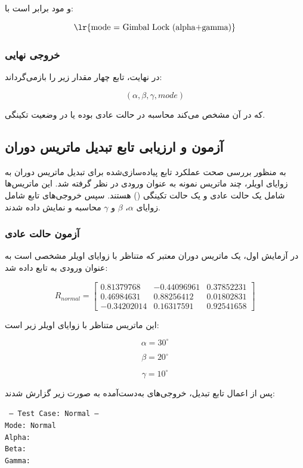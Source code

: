 \documentclass{article}
\begin{document}
و مود برابر است با:

\[
\text{\lr{mode = Gimbal Lock (alpha+gamma)}}
\]

\subsubsection{خروجی نهایی}

در نهایت، تابع چهار مقدار زیر را بازمی‌گرداند:

\[
(\alpha, \beta, \gamma, mode)
\]

که در آن 
مشخص می‌کند محاسبه در حالت عادی بوده یا در وضعیت تکینگی.
\subsection{آزمون و ارزیابی تابع تبدیل ماتریس دوران}

به منظور بررسی صحت عملکرد تابع پیاده‌سازی‌شده برای تبدیل ماتریس دوران به زوایای اویلر، چند ماتریس نمونه به عنوان ورودی در نظر گرفته شد. این ماتریس‌ها شامل یک حالت عادی و یک حالت تکینگی () هستند. سپس خروجی‌های تابع شامل زوایای $\alpha$، $\beta$ و $\gamma$ محاسبه و نمایش داده شدند.

\subsubsection{آزمون حالت عادی}

در آزمایش اول، یک ماتریس دوران معتبر که متناظر با زوایای اویلر مشخصی است به عنوان ورودی به تابع داده شد:

\[
R_{normal} =
\begin{bmatrix}
	0.81379768 & -0.44096961 & 0.37852231 \\
	0.46984631 & 0.88256412 & 0.01802831 \\
	-0.34202014 & 0.16317591 & 0.92541658
\end{bmatrix}
\]

این ماتریس متناظر با زوایای اویلر زیر است:

\[
\alpha = 30^\circ
\]

\[
\beta = 20^\circ
\]

\[
\gamma = 10^\circ
\]

پس از اعمال تابع تبدیل، خروجی‌های به‌دست‌آمده به صورت زیر گزارش شدند:

\begin{LTR}
	\texttt{
		--- Test Case: Normal ---\\
		Mode:  Normal\\
		Alpha: \\
		Beta:  \\
		Gamma: 
	}
\end{LTR}
\end{document}
